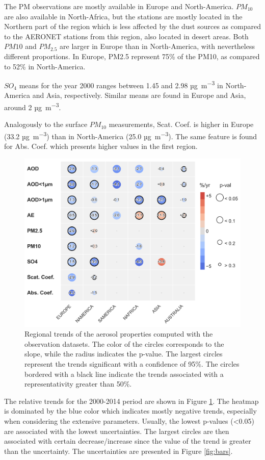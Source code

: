 \documentclass[journal abbreviation, manuscript]{copernicus}
\begin{document}
The PM observations are mostly available in Europe and North-America. $PM_{10}$ are also available in North-Africa, but the stations are mostly located in the Northern part of the region which is less affected by the dust sources as compared to the AERONET stations from this region, also located in desert areas. Both $PM{10}$ and $PM_{2.5}$ are larger in Europe than in North-America, with nevertheless different proportions. In Europe, PM2.5 represent 75\% of the PM10, as compared to 52\% in North-America.

$SO_{4}$ means for the year 2000 ranges between 1.45 and 2.98 \unit{µg.m^{-3}} in North-America and Asia, respectively. Similar means are found in Europe and Asia, around 2 \unit{µg.m^{-3}}.

Analogously to the surface $PM_{10}$ measurements, Scat. Coef. is higher in Europe (33.2 \unit{µg.m^{-3}}) than in North-America (25.0 \unit{µg.m^{-3}}). The same feature is found for Abs. Coef. which presents higher values in the first region.

\begin{figure}[t]
 \includegraphics[width=12cm]{../scripts/figs/heatmaps/OBS.png}
 \caption{Regional trends of the aerosol properties computed with the observation datasets. The color of the circles corresponds to the slope, while the radius indicates the p-value. The largest circles represent the trends significant with a confidence of 95\%. The circles bordered with a black line indicate the trends associated with a representativity greater than 50\%.}
 \label{fig:obs_trends}
\end{figure}

The relative trends for the 2000-2014 period are shown in Figure \ref{fig:obs_trends}. The heatmap is dominated by the blue color which indicates mostly negative trends, especially when considering the extensive parameters. Usually, the lowest p-values (<0.05) are associated with the lowest uncertainties. The largest circles are then associated with certain decrease/increase since the value of the trend is greater than the uncertainty. The uncertainties are presented in Figure \ref{fig:bars}.
\end{document}
